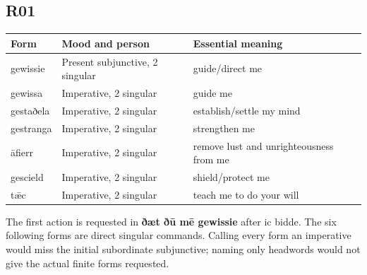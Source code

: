 \subsection*{R01}

\par\begin{minipage}{\linewidth}\raggedright
\par\begingroup
\fontsize{10.5}{13.2}\selectfont
\setlength{\LTleft}{0pt}\setlength{\LTright}{\fill}
\noindent
\begin{tabular}{@{}>{\raggedright\arraybackslash}p{20.8mm}>{\raggedright\arraybackslash}p{42.75mm}>{\raggedright\arraybackslash}p{54.82mm}@{}}
\toprule
\textbf{Form} & \textbf{Mood and person} & \textbf{Essential meaning} \\
\midrule
gewissie & Present subjunctive, 2 singular & guide/\allowbreak{}direct me \\
gewissa & Imperative, 2 singular & guide me \\
gestaðela & Imperative, 2 singular & establish/\allowbreak{}settle my mind \\
gestranga & Imperative, 2 singular & strengthen me \\
āfierr & Imperative, 2 singular & remove lust and unrighteousness from me \\
gescield & Imperative, 2 singular & shield/\allowbreak{}protect me \\
tǣc & Imperative, 2 singular & teach me to do your will \\
\bottomrule
\end{tabular}
\par\endgroup

The first action is requested in \textbf{ðæt ðū mē gewissie} after ic bidde. The six following forms are direct singular commands. Calling every form an imperative would miss the initial subordinate subjunctive; naming only headwords would not give the actual finite forms requested.

\end{minipage}\par\addvspace{4pt}

